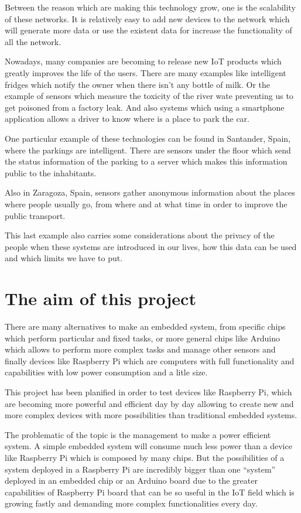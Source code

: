 	Between the reason which are making this technology grow, one is the scalability of these networks. It is relatively easy to add new devices to the network which will generate more data or use the existent data for increase the functionality of all the network. %

	Nowadays, many companies are becoming to release new IoT products which greatly improves the life of the users.
	There are many examples like intelligent fridges which notify the owner when there isn't any bottle of milk. Or the example of sensors which measure the toxicity of the river wate preventing us to get poisoned from a factory leak. And also systems which using a smartphone application allows a driver to know where is a place to park the car.

	One particular example of these technologies can be found in Santander, Spain, where the parkings are intelligent. There are sensors under the floor which send the status information of the parking to a server which makes this information public to the inhabitants.

	Also in Zaragoza, Spain, sensors gather anonymous information about the places where people usually go, from where and at what time in order to improve the public transport.

	This last example also carries some considerations about the privacy of the people when these systems are introduced in our lives, how this data can be used and which limits we have to put. %

	\section{The aim of this project}
	There are many alternatives to make an embedded system, from specific chips which perform particular and fixed tasks, or more general chips like Arduino which allows to perform more complex tasks and manage other sensors and finally devices like Raspberry Pi which are computers with full functionality and capabilities with low power consumption and a litle size.

	This project has been planified in order to test devices like Raspberry Pi, which are becoming more powerful and efficient day by day allowing to create new and more complex devices with more possibilities than traditional embedded systems.

	The problematic of the topic is the management to make a power efficient system. A simple embedded system will consume much less power than a device like Raspberry Pi which is composed by many chips. But the possibilities of a system deployed in a Raspberry Pi are incredibly bigger than one ``system'' deployed in an embedded chip or an Arduino board due to the greater capabilities of Raspberry Pi board that can be so useful in the IoT field which is growing fastly and demanding more complex functionalities every day.


